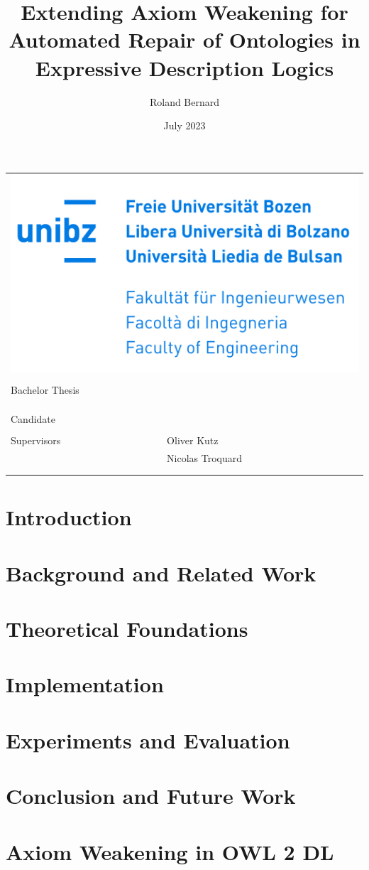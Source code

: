 \documentclass[10pt,a4paper]{report}
\title{Extending Axiom Weakening for Automated Repair of Ontologies in Expressive Description Logics}
\author{Roland Bernard}
\date{July 2023}
\makeatletter
\theoremstyle{plain}
\theoremstyle{definition}
\theoremstyle{remark}
\def\maketitle{
    \begin{tabular}{ll}
        \multicolumn{2}{r}{\includegraphics[width=0.5\linewidth]{resources/unibz-logo.png}} \\
        \vspace*{40mm} \\
        \multicolumn{2}{l}{\raggedright Bachelor Thesis} \\
        \vspace*{1mm} \\
        \multicolumn{2}{p{\linewidth}}{\raggedright \huge \bf \@title} \\
        \vspace*{30mm} \\
        Candidate   & \@author \\
        \vspace*{5mm} \\
        Supervisors & Oliver Kutz \\
                    & Nicolas Troquard \\
        \vspace*{20mm} \\
        \multicolumn{2}{p{\linewidth}}{\@date}
    \end{tabular}
}
\makeatother
\begin{document}
\maketitle

\begin{abstract}
    
\end{abstract}

\tableofcontents

\chapter{Introduction}



\chapter{Background and Related Work}



\chapter{Theoretical Foundations}



\chapter{Implementation}



\chapter{Experiments and Evaluation}



\chapter{Conclusion and Future Work}



\printbibliography

\appendix

\chapter{Axiom Weakening in OWL 2 DL} \label{weakening-owl-2-dl}


\end{document}
